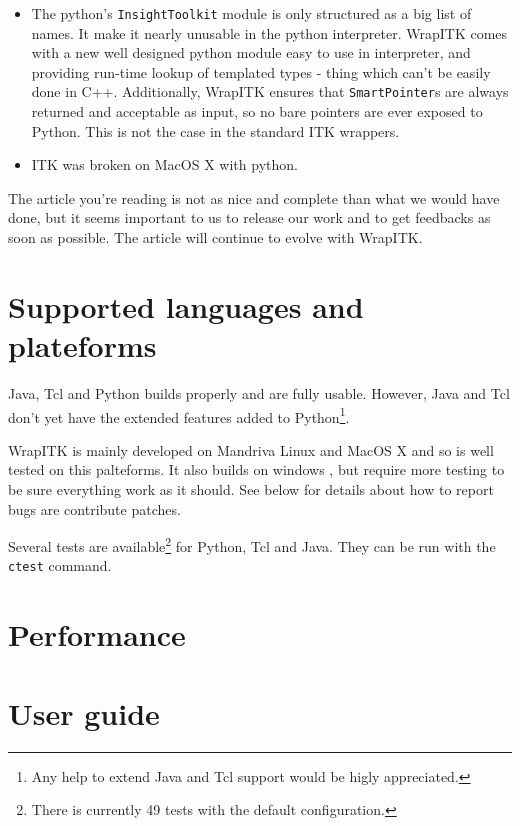 \documentclass{InsightArticle}
\begin{document}
\begin{itemize}
  \item  The python's \verb$InsightToolkit$ module is only structured as a big
list of names. It make it nearly unusable in the python interpreter. WrapITK
comes with a new well designed python module easy to use in interpreter, and
providing run-time lookup of templated types - thing which can't be easily done
in C++. Additionally, WrapITK ensures that \verb$SmartPointer$s are always
returned and acceptable as input, so no bare pointers are ever exposed to
Python. This is not the case in the standard ITK wrappers.

  \item ITK was broken on MacOS X \cite{MacOsXWebSite} with python.

\end{itemize}

The article you're reading is not as nice and complete than what we would have
done, but it seems important to us to release our work and to get feedbacks
as soon as possible. The article will continue to evolve with WrapITK.

\section{Supported languages and plateforms}

Java, Tcl and Python builds properly and are fully usable. However, Java and
Tcl don't yet have the extended features added to Python\footnote{Any help
to extend Java and Tcl support would be higly appreciated.}.

WrapITK is mainly developed on Mandriva Linux \cite{MandrivaWebSite} and 
MacOS X \cite{MacOsXWebSite} and so is well tested on this palteforms.
It also builds on windows \cite{WindowsWebSite}, but require more testing
to be sure everything work as it should. See below for details about how
to report bugs are contribute patches.

Several tests are available\footnote{There is currently 49 tests with the default
configuration.} for Python, Tcl and Java. They can be run with the \verb$ctest$
command.

\section{Performance}

\section{User guide}
\end{document}
